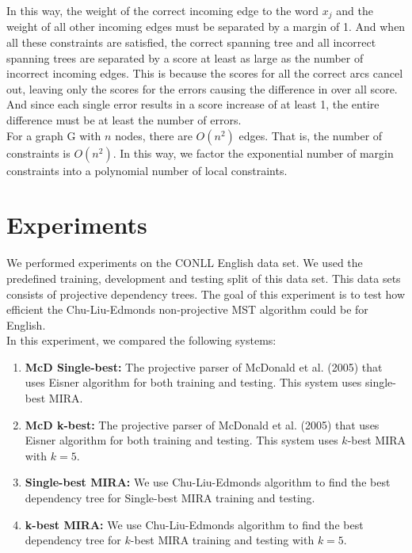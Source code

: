 \documentclass[12pt]{article}
\begin{document}
In this way, the weight of the correct incoming edge to the word $x_j$ and the weight of all other incoming edges must be separated by a margin of 1. And when all these constraints are satisfied, the correct spanning tree and all incorrect spanning trees are separated by a score at least as large as the number of incorrect incoming edges. This is because the scores for all the correct arcs cancel out, leaving only the scores for the errors causing the difference in over all score. And since each single error results in a score increase of at least 1, the entire difference must be at least the number of errors. \\

For a graph G with $n$ nodes, there are $O(n^2)$ edges. That is, the number of constraints is $O(n^2)$. In this way, we factor the exponential number of margin constraints into a polynomial number of local constraints. 

\section{Experiments}

We performed experiments on the CONLL English data set. We used the predefined training, development and testing split of this data set. This data sets consists of projective dependency trees. The goal of this experiment is to test how efficient the Chu-Liu-Edmonds non-projective MST algorithm could be for English. \\

In this experiment, we compared the following systems:

\begin{enumerate}
\item {\bf McD Single-best:} The projective parser of McDonald et al. (2005) that uses Eisner algorithm for both training and testing. This system uses single-best MIRA.
\item {\bf McD k-best:} The projective parser of McDonald et al. (2005) that uses Eisner algorithm for both training and testing. This system uses $k$-best MIRA with $k = 5$.
\item {\bf Single-best MIRA:} We use Chu-Liu-Edmonds algorithm to find the best dependency tree for Single-best MIRA training and testing.
\item {\bf k-best MIRA:} We use Chu-Liu-Edmonds algorithm to find the best dependency tree for $k$-best MIRA training and testing with $k = 5$.
\end{enumerate}
\end{document}
